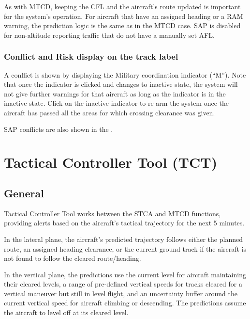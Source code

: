 \documentclass[a4paper,oneside,11pt]{memoir}
\begin{document}
As with MTCD, keeping the CFL and the aircraft’s route updated is important for the system’s operation. For aircraft that have an assigned heading or a RAM warning, the prediction logic is the same as in the MTCD case. SAP is disabled for non-altitude reporting traffic that do not have a manually set AFL.

\subsubsection*{Conflict and Risk display on the track label}

A conflict is shown by displaying the Military coordination indicator (“M”). Note that once the indicator is clicked and changes to inactive state, the system will not give further warnings for that aircraft as long as the indicator is in the inactive state. Click on the inactive indicator to re-arm the system once the aircraft has passed all the areas for which crossing clearance was given.

\bigskip

SAP conflicts are also shown in the .

\section{Tactical Controller Tool (TCT)}\label{tool:tct}

\subsection{General}

Tactical Controller Tool works between the STCA and MTCD functions, providing alerts based on the aircraft’s tactical trajectory for the next 5 minutes.

\bigskip

In the lateral plane, the aircraft’s predicted trajectory follows either the planned route, an assigned heading clearance, or the current ground track if the aircraft is not found to follow the cleared route/heading.

\bigskip

In the vertical plane, the predictions use the current level for aircraft maintaining their cleared levels, a range of pre-defined vertical speeds for tracks cleared for a vertical maneuver but still in level flight, and an uncertainty buffer around the current vertical speed for aircraft climbing or descending. The predictions assume the aircraft to level off at its cleared level.
\end{document}
